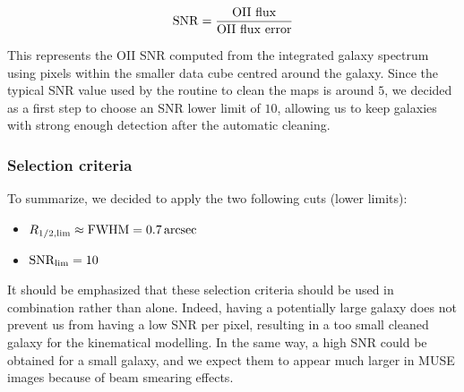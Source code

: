 \begin{equation}
	\rm{SNR} = \frac{\rm{OII \,\, flux}}{\rm{OII \,\, flux \,\, error}}
\end{equation}

This represents the OII SNR computed from the integrated galaxy spectrum using pixels within the smaller data cube centred around the galaxy. Since the typical SNR value used by the routine to clean the maps is around $5$, we decided as a first step to choose an SNR lower limit of $10$, allowing us to keep galaxies with strong enough detection after the automatic cleaning.

\subsubsection{Selection criteria}

To summarize, we decided to apply the two following cuts (lower limits):

\begin{itemize}
	\item $R_{1/2 , \rm{lim}} \approx \rm{FWHM} = \SI{0.7}{arcsec}$
	\item $\rm{SNR_{lim}} = 10$
\end{itemize}

It should be emphasized that these selection criteria should be used in combination rather than alone. Indeed, having a potentially large galaxy does not prevent us from having a low SNR per pixel, resulting in a too small cleaned galaxy for the kinematical modelling. In the same way, a high SNR could be obtained for a small galaxy, and we expect them to appear much larger in MUSE images because of beam smearing effects.





 
